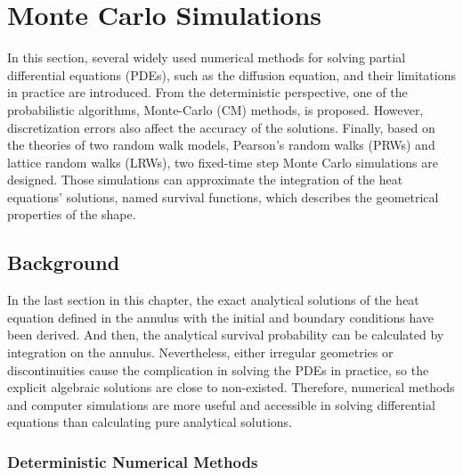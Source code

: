 \section{Monte Carlo Simulations}

In this section, several widely used numerical methods for solving
partial differential equations (PDEs), such as the diffusion equation,
and their limitations in practice are introduced. From the
deterministic perspective, one of the probabilistic algorithms,
Monte-Carlo (CM) methods, is proposed. However, discretization errors
also affect the accuracy of the solutions. Finally, based on the
theories of two random walk models, Pearson's random walks (PRWs) and
lattice random walks (LRWs), two fixed-time step Monte Carlo
simulations are designed. Those simulations can approximate the
integration of the heat equations' solutions, named survival
functions, which describes the geometrical properties of the shape.


\subsection{Background}

In the last section in this chapter, the exact analytical solutions of
the heat equation defined in the annulus with the initial and boundary
conditions have been derived. And then, the analytical survival
probability can be calculated by integration on the
annulus. Nevertheless, either irregular geometries or discontinuities
cause the complication in solving the PDEs in practice, so the
explicit algebraic solutions are close to non-existed. Therefore,
numerical methods and computer simulations are more useful and
accessible in solving differential equations than calculating pure
analytical solutions.

\subsubsection{Deterministic Numerical Methods}

